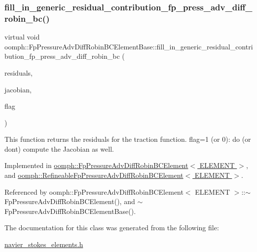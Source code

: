 \subsubsection{\texorpdfstring{fill\+\_\+in\+\_\+generic\+\_\+residual\+\_\+contribution\+\_\+fp\+\_\+press\+\_\+adv\+\_\+diff\+\_\+robin\+\_\+bc()}{fill\_in\_generic\_residual\_contribution\_fp\_press\_adv\_diff\_robin\_bc()}}
{\footnotesize\ttfamily virtual void oomph\+::\+Fp\+Pressure\+Adv\+Diff\+Robin\+B\+C\+Element\+Base\+::fill\+\_\+in\+\_\+generic\+\_\+residual\+\_\+contribution\+\_\+fp\+\_\+press\+\_\+adv\+\_\+diff\+\_\+robin\+\_\+bc (\begin{DoxyParamCaption}\item[{\hyperlink{classoomph_1_1Vector}{Vector}$<$ double $>$ \&}]{residuals,  }\item[{\hyperlink{classoomph_1_1DenseMatrix}{Dense\+Matrix}$<$ double $>$ \&}]{jacobian,  }\item[{unsigned}]{flag }\end{DoxyParamCaption})\hspace{0.3cm}{\ttfamily [pure virtual]}}



This function returns the residuals for the traction function. flag=1 (or 0)\+: do (or don\textquotesingle{}t) compute the Jacobian as well. 



Implemented in \hyperlink{classoomph_1_1FpPressureAdvDiffRobinBCElement_a6a902a30a8b1c2d4105a7c0639a81f58}{oomph\+::\+Fp\+Pressure\+Adv\+Diff\+Robin\+B\+C\+Element$<$ E\+L\+E\+M\+E\+N\+T $>$}, and \hyperlink{classoomph_1_1RefineableFpPressureAdvDiffRobinBCElement_ae1c6ebf08fa0aa27847b963cb3bcd581}{oomph\+::\+Refineable\+Fp\+Pressure\+Adv\+Diff\+Robin\+B\+C\+Element$<$ E\+L\+E\+M\+E\+N\+T $>$}.



Referenced by oomph\+::\+Fp\+Pressure\+Adv\+Diff\+Robin\+B\+C\+Element$<$ E\+L\+E\+M\+E\+N\+T $>$\+::$\sim$\+Fp\+Pressure\+Adv\+Diff\+Robin\+B\+C\+Element(), and $\sim$\+Fp\+Pressure\+Adv\+Diff\+Robin\+B\+C\+Element\+Base().



The documentation for this class was generated from the following file\+:\begin{DoxyCompactItemize}
\item 
\hyperlink{navier__stokes__elements_8h}{navier\+\_\+stokes\+\_\+elements.\+h}\end{DoxyCompactItemize}
